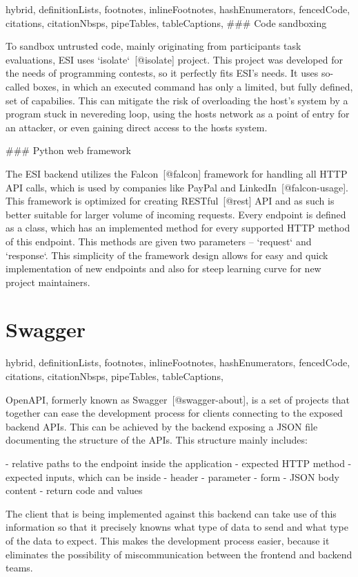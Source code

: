 \documentclass[
  digital, %
  oneside, %
  lof,     %
  lot,     %
]{fithesis4}
\begin{document}
\begin{markdown*}{%
  hybrid,
  definitionLists,
  footnotes,
  inlineFootnotes,
  hashEnumerators,
  fencedCode,
  citations,
  citationNbsps,
  pipeTables,
  tableCaptions,
}
### Code sandboxing

To sandbox untrusted code, mainly originating from participants task evaluations, ESI uses `isolate`~[@isolate] project. This project was developed for the needs of programming contests, so it perfectly fits ESI's needs. It uses so-called boxes, in which an executed command has only a limited, but fully defined, set of capabilies. This can mitigate the risk of overloading the host's system by a program stuck in nevereding loop, using the hosts network as a point of entry for an attacker, or even gaining direct access to the hosts system.

### Python web framework

The ESI backend utilizes the Falcon~[@falcon] framework for handling all HTTP API calls, which is used by companies like PayPal and LinkedIn~[@falcon-usage]. This framework is optimized for creating RESTful~[@rest] API and as such is better suitable for larger volume of incoming requests. Every endpoint is defined as a class, which has an implemented method for every supported HTTP method of this endpoint. This methods are given two parameters -- `request` and `response`. This simplicity of the framework design allows for easy and quick implementation of new endpoints and also for steep learning curve for new project maintainers.

\end{markdown*}

\chapter{Swagger}
\shorthandoff{-}
\begin{markdown*}{%
  hybrid,
  definitionLists,
  footnotes,
  inlineFootnotes,
  hashEnumerators,
  fencedCode,
  citations,
  citationNbsps,
  pipeTables,
  tableCaptions,
}

OpenAPI, formerly known as Swagger~[@swagger-about], is a set of projects that together can ease the development process for clients connecting to the exposed backend APIs. This can be achieved by the backend exposing a JSON file documenting the structure of the APIs. This structure mainly includes:

- relative paths to the endpoint inside the application
- expected HTTP method
- expected inputs, which can be inside
    - header
    - parameter
    - form
    - JSON body content
- return code and values


The client that is being implemented against this backend can take use of this information so that it precisely knowns what type of data to send and what type of the data to expect. This makes the development process easier, because it eliminates the possibility of miscommunication between the frontend and backend teams. 

\end{markdown*}
\end{document}
